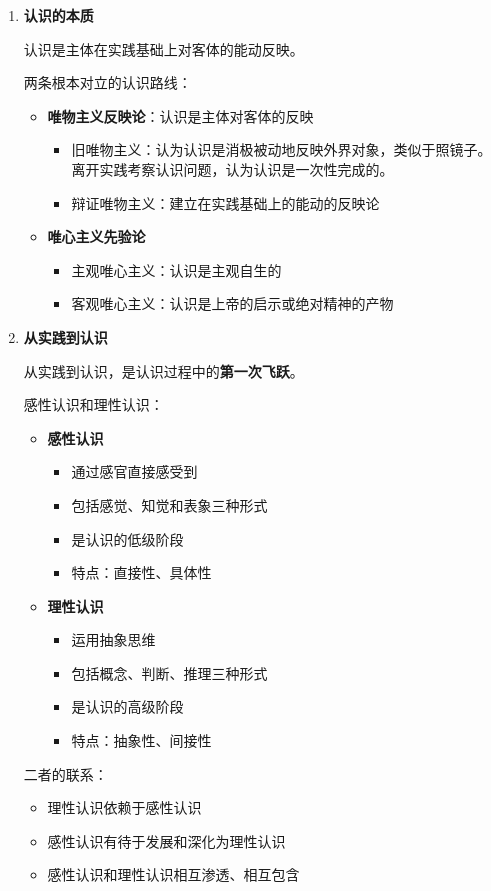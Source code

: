 \documentclass[12pt, a4paper, oneside]{ctexart}
\begin{document}
\begin{enumerate}
  \item {\bf 认识的本质}
  
  认识是主体在实践基础上对客体的能动反映。

  两条根本对立的认识路线：
  \begin{itemize}
    \item {\bf 唯物主义反映论}：认识是主体对客体的反映
    \begin{itemize}
      \item 旧唯物主义：认为认识是消极被动地反映外界对象，类似于照镜子。离开实践考察认识问题，认为认识是一次性完成的。
      \item 辩证唯物主义：建立在实践基础上的能动的反映论
    \end{itemize}
    \item {\bf 唯心主义先验论}
    \begin{itemize}
      \item 主观唯心主义：认识是主观自生的
      \item 客观唯心主义：认识是上帝的启示或绝对精神的产物
    \end{itemize}
  \end{itemize}
  \item {\bf 从实践到认识}
  
  从实践到认识，是认识过程中的\textbf{第一次飞跃}。

  感性认识和理性认识：
  \begin{itemize}
    \item {\bf 感性认识}
    \begin{itemize}
      \item 通过感官直接感受到
      \item 包括感觉、知觉和表象三种形式
      \item 是认识的低级阶段
      \item 特点：直接性、具体性
    \end{itemize}
    \item {\bf 理性认识}
    \begin{itemize}
      \item 运用抽象思维
      \item 包括概念、判断、推理三种形式
      \item 是认识的高级阶段
      \item 特点：抽象性、间接性
    \end{itemize}
  \end{itemize}

  二者的联系：
  \begin{itemize}
    \item 理性认识依赖于感性认识
    \item 感性认识有待于发展和深化为理性认识
    \item 感性认识和理性认识相互渗透、相互包含
  \end{itemize}


\end{enumerate}
\end{document}
